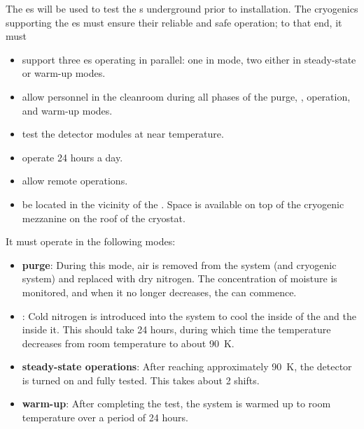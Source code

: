 \label{sec:fdsp-tc-cryocoldbox}


The  \coldbox{}es will be used to test the s underground prior to installation.  
The cryogenics supporting the \coldbox{}es  must ensure their reliable and safe operation; to that end, it must
\begin{itemize}
\setlength\itemsep{1mm}
\setlength{\parsep}{1mm}
\setlength{\itemsep}{-5mm}
\item support three \coldbox{}es operating in parallel: 
one in \cooldown mode, two either in steady-state or warm-up modes.
\item allow personnel in the cleanroom during all phases of the purge, \cooldown, operation, and warm-up modes. 
\item test the detector modules at near  temperature.
\item operate 24 hours a day.
\item allow remote operations.
\item be located in the vicinity of the . Space is available on top of the cryogenic mezzanine on the roof of the cryostat.
\end{itemize}

It must operate in the following modes: 

\begin{itemize}
\setlength\itemsep{1mm}
\setlength{\parsep}{1mm}
\setlength{\itemsep}{-5mm}
\item \textbf{purge}: During this mode, air is removed from the system (\coldbox and cryogenic system) and replaced with dry nitrogen. The concentration of moisture is monitored, and when it no longer decreases, the \cooldown can commence.
\item \textbf{\cooldown}: Cold nitrogen is introduced into the system to cool the inside of the \coldbox and the  inside it. 
This should take 24 hours, during which time the temperature decreases from room temperature to about \SI{90}{K}. 
\item \textbf{steady-state operations}: After reaching approximately \SI{90}{K}, 
the detector is turned on and fully tested. 
This takes about 2 shifts.
\item \textbf{warm-up}: After completing the test, the system is
warmed up to room temperature over a period of 24 hours. 
\end{itemize}

